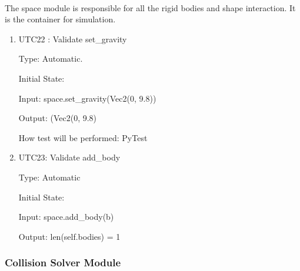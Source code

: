 \documentclass[12pt, titlepage]{article}
\begin{document}
\paragraph{}
The space module is responsible for all the rigid bodies and shape interaction. It is the container for simulation.
\begin{enumerate}
	
	
	\item{UTC22} {: Validate set\_gravity \\}
	
	Type: Automatic.
	
	Initial State: 
	
	Input: space.set\_gravity(Vec2(0, 9.8))
	
	Output: (Vec2(0, 9.8)
	
	How test will be performed: PyTest 
	
	\item{UTC23}{: Validate add\_body\\}
	
	Type: Automatic
	
	Initial State: 
	
	Input: space.add\_body(b)
	
	Output: len(self.bodies) = 1
	

	\end{enumerate}

\subsubsection{Collision Solver Module}
\end{document}
